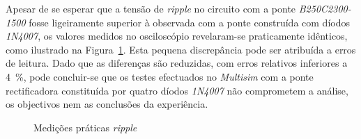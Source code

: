 Apesar de se esperar que a tensão de \textit{ripple} no circuito com a ponte \textit{B250C2300-1500} fosse ligeiramente superior à observada com a ponte construída com díodos \textit{1N4007}, os valores medidos no osciloscópio revelaram-se praticamente idênticos, como ilustrado na Figura~\ref{fig:testesrippleOC}. Esta pequena discrepância pode ser atribuída a erros de leitura. Dado que as diferenças são reduzidas, com erros relativos inferiores a \SI{4}{\percent}, pode concluir-se que os testes efectuados no \textit{Multisim} com a ponte rectificadora constituída por quatro díodos \textit{1N4007} não comprometem a análise, os objectivos nem as conclusões da experiência.

\begin{figure}[hbtp]
	\centering%
		\centering
		\qquad
		\caption{Medições práticas  \textit{ripple}}%
		\label{fig:testesrippleOC}%
	\end{figure}

